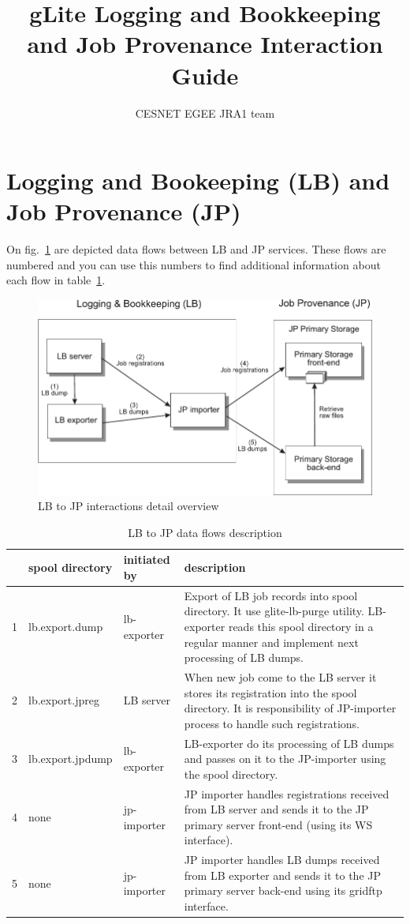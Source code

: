 \documentclass{egee}
\title{gLite Logging and Bookkeeping and Job Provenance Interaction Guide}
\author{CESNET EGEE JRA1 team}
\begin{document}
%

\section{Logging and Bookeeping (LB) and Job Provenance (JP)}
On fig.~\ref{fig:LB-JP-interactions} are depicted data flows between
LB and JP services. These flows are numbered and you can use this
numbers to find additional information about each flow in
table~\ref{tab:LB-JP-interactions}.

\begin{figure}[htpb]
  \centering
  \includegraphics[width=0.9\hsize]{LB-JP-interaction-details}
  \caption{LB to JP interactions detail overview}
  \label{fig:LB-JP-interactions}
\end{figure}

\begin{table}[htpb]
 \centering
  \begin{tabular}{|c|l|l|p{9cm}|}
    \hline
    &spool directory&initiated by&description\\
    \hline
    \hline
    1&lb.export.dump&lb-exporter&Export of LB job records into spool 
    directory. It use glite-lb-purge utility. LB-exporter reads this
    spool directory
    in a regular manner and implement next processing of LB dumps.\\
    \hline
    2&lb.export.jpreg&LB server&When new job come to the LB server 
    it stores its
    registration into the spool directory. It is responsibility of
    JP-importer process to handle such registrations.\\
    \hline
    3&lb.export.jpdump&lb-exporter&LB-exporter do its processing of 
    LB dumps and passes
    on it to the JP-importer using the spool directory.\\
    \hline
    4&none&jp-importer&JP importer handles registrations received from LB
    server and sends it to the JP primary server front-end (using its WS
    interface).\\
    \hline
    5&none&jp-importer&JP importer handles LB dumps received from LB
    exporter and sends it to the JP primary server back-end using its
    gridftp interface.\\
    \hline
  \end{tabular}
  \caption{LB to JP data flows description}
  \label{tab:LB-JP-interactions}
\end{table}
\end{document}

